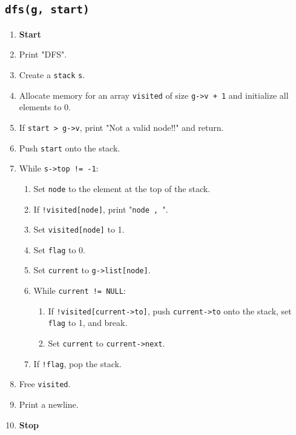 {  \subsection{\texttt{dfs(g, start)}}
  \begin{enumerate}[label=\arabic*:,left=0pt]
    \item \textbf{Start}
    \item Print "DFS".
    \item Create a \texttt{stack} \texttt{s}.
    \item Allocate memory for an array \texttt{visited} of size \texttt{g->v + 1} and initialize all elements to 0.
    \item If \texttt{start > g->v}, print "Not a valid node!!" and return.
    \item Push \texttt{start} onto the stack.
    \item While \texttt{s->top != -1}:
          \begin{enumerate}[label=7.\arabic*:, start=1]
            \item Set \texttt{node} to the element at the top of the stack.
            \item If \texttt{!visited[node]}, print "\texttt{node , }".
            \item Set \texttt{visited[node]} to 1.
            \item Set \texttt{flag} to 0.
            \item Set \texttt{current} to \texttt{g->list[node]}.
            \item While \texttt{current != NULL}:
                  \begin{enumerate}[label=7.5.\arabic*:, start=1]
                    \item If \texttt{!visited[current->to]}, push \texttt{current->to} onto the stack, set \texttt{flag} to 1, and break.
                    \item Set \texttt{current} to \texttt{current->next}.
                  \end{enumerate}
            \item If \texttt{!flag}, pop the stack.
          \end{enumerate}
    \item Free \texttt{visited}.
    \item Print a newline.
    \item \textbf{Stop}
  \end{enumerate}

}
